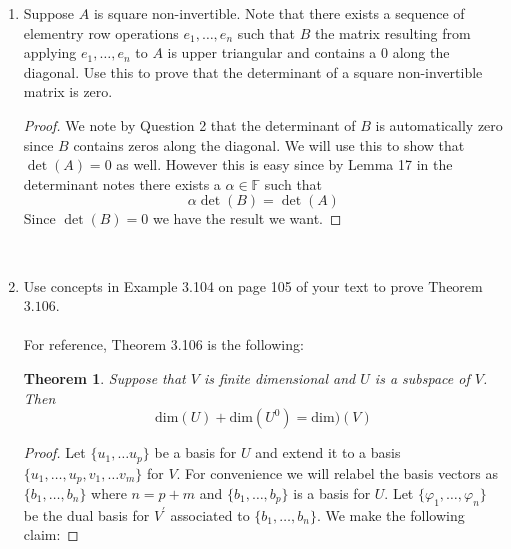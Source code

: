 \documentclass[12pt,letterpaper]{article}
\theoremstyle{plain}
\newtheorem*{theorem*}{Theorem}
\theoremstyle{definition}
\begin{document}
\begin{enumerate}[1.]
\begin{proof}
\ \\
{\bf Version 1: }If $A^k=0$ then $\det(A^k)=\det(0)=0$. By the multiplicative property we have that 
\[\det(A)^k=0\] and hence 
\[\det(A)=0\]
by taking $k$-th roots. \\
\ \\
{\bf Version 2: }Suppose that $A$ is nilpotent but has a non-zero determinant. By the question above and the question below we have that $A$ must be invertible. Let $A^{-1}$ denote its inverse. Let $k$ be the smallest positive integer such that $A^k=0$.  
\[I=A^{-1}A\]
\[A^{k-1}=IA^{k-1}=A^{-1}AA^{k-1}=A^{-1}A^{k}=A^{-1}0=0\]
Which is a contradiction on the condition we put on $k$. 
\end{proof}
\ \\
\item Suppose $A$ is square non-invertible. Note that there exists a sequence of elementry row operations $e_1,\ldots ,e_n$ such that 
$B$ the matrix resulting from applying $e_1,\ldots, e_n$ to $A$ is upper triangular and contains a $0$ along the diagonal. Use this to prove that the determinant of a square non-invertible matrix is zero. \\
\begin{proof} We note by Question 2 that the determinant of $B$ is automatically zero since $B$ contains zeros along the diagonal. We will use this to show that $\det(A)=0$ as well. However this is easy since by Lemma 17 in the determinant notes there exists a $\alpha\in \mathbb{F}$ such that 
\[\alpha\det(B)=\det(A)\]
Since $\det(B)=0$ we have the result we want. 
\end{proof}
\ \\
\item Use concepts in Example 3.104 on page 105 of your text to prove Theorem $3.106$.\\
\ \\
For reference, Theorem 3.106 is the following:
\begin{theorem*} Suppose that $V$ is finite dimensional and $U$ is a subspace of $V$. Then 
\[\text{dim}(U)+\text{dim}(U^0)=\text{dim})(V)\]
\end{theorem*}
\begin{proof}Let $\{u_1, \ldots u_p\}$ be a basis for $U$ and extend it to a basis $\{u_1, \ldots, u_p, v_1, \ldots v_m\}$ for $V$. For convenience we will relabel the basis vectors as $\{b_1, \ldots, b_n\}$ where $n=p+m$ and $\{b_1, \ldots, b_p\}$ is a basis for $U$. Let $\{\varphi_1, \ldots, \varphi_n\}$ be the dual basis for $V^\prime$ associated to $\{b_1, \ldots, b_n\}$. We make the following claim:

\end{proof}
\end{enumerate}
\end{document}
